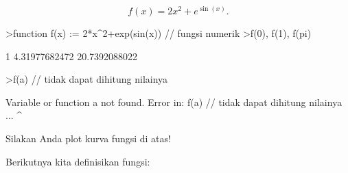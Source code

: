 \documentclass[a4paper,10pt]{article}
\begin{document}
\begin{eulernotebook}
\begin{eulercomment}
\begin{eulercomment}
\begin{eulercomment}
\begin{eulercomment}
\begin{eulercomment}
\begin{eulercomment}
\begin{eulercomment}
\begin{eulercomment}
\begin{eulercomment}
\begin{eulercomment}
\begin{eulercomment}
\begin{eulercomment}
\begin{eulercomment}
\end{eulercomment}
\begin{eulerformula}
\[
f(x)=2x^2+e^{\sin(x)}.
\]
\end{eulerformula}
\begin{eulerprompt}
>function f(x) := 2*x^2+exp(sin(x)) // fungsi numerik
>f(0), f(1), f(pi)
\end{eulerprompt}
\begin{euleroutput}
  1
  4.31977682472
  20.7392088022
\end{euleroutput}
\begin{eulerprompt}
>f(a) // tidak dapat dihitung nilainya
\end{eulerprompt}
\begin{euleroutput}
  Variable or function a not found.
  Error in:
  f(a) // tidak dapat dihitung nilainya ...
     ^
\end{euleroutput}
\begin{eulercomment}
Silakan Anda plot kurva fungsi di atas!

Berikutnya kita definisikan fungsi:


\end{eulercomment}
\end{eulercomment}
\end{eulercomment}
\end{eulercomment}
\end{eulercomment}
\end{eulercomment}
\end{eulercomment}
\end{eulercomment}
\end{eulercomment}
\end{eulercomment}
\end{eulercomment}
\end{eulercomment}
\end{eulercomment}
\end{eulernotebook}
\end{document}
